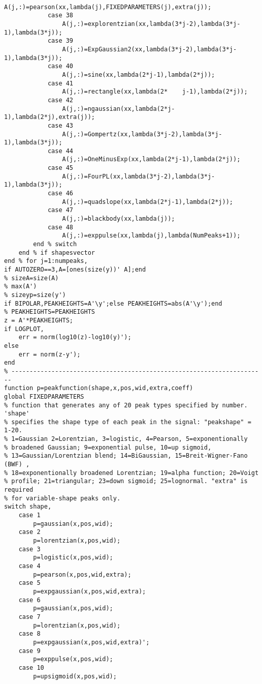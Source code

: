 \begin{lstlisting}
                A(j,:)=pearson(xx,lambda(j),FIXEDPARAMETERS(j),extra(j));
            case 38
                A(j,:)=explorentzian(xx,lambda(3*j-2),lambda(3*j-1),lambda(3*j));                    
            case 39
                A(j,:)=ExpGaussian2(xx,lambda(3*j-2),lambda(3*j-1),lambda(3*j));                               
            case 40
                A(j,:)=sine(xx,lambda(2*j-1),lambda(2*j));
            case 41
                A(j,:)=rectangle(xx,lambda(2*    j-1),lambda(2*j));
            case 42
                A(j,:)=ngaussian(xx,lambda(2*j-1),lambda(2*j),extra(j));
            case 43
                A(j,:)=Gompertz(xx,lambda(3*j-2),lambda(3*j-1),lambda(3*j));
            case 44
                A(j,:)=OneMinusExp(xx,lambda(2*j-1),lambda(2*j));
            case 45
                A(j,:)=FourPL(xx,lambda(3*j-2),lambda(3*j-1),lambda(3*j));        
            case 46
                A(j,:)=quadslope(xx,lambda(2*j-1),lambda(2*j));
            case 47
                A(j,:)=blackbody(xx,lambda(j));
            case 48
                A(j,:)=exppulse(xx,lambda(j),lambda(NumPeaks+1));
        end % switch
    end % if shapesvector
end % for j=1:numpeaks,
if AUTOZERO==3,A=[ones(size(y))' A];end
% sizeA=size(A)
% max(A')
% sizeyp=size(y')
if BIPOLAR,PEAKHEIGHTS=A'\y';else PEAKHEIGHTS=abs(A'\y');end
% PEAKHEIGHTS=PEAKHEIGHTS
z = A'*PEAKHEIGHTS;
if LOGPLOT,
    err = norm(log10(z)-log10(y)');
else
    err = norm(z-y');
end
% ----------------------------------------------------------------------
function p=peakfunction(shape,x,pos,wid,extra,coeff)
global FIXEDPARAMETERS
% function that generates any of 20 peak types specified by number. 'shape'
% specifies the shape type of each peak in the signal: "peakshape" = 1-20.
% 1=Gaussian 2=Lorentzian, 3=logistic, 4=Pearson, 5=exponentionally
% broadened Gaussian; 9=exponential pulse, 10=up sigmoid,
% 13=Gaussian/Lorentzian blend; 14=BiGaussian, 15=Breit-Wigner-Fano (BWF) ,
% 18=exponentionally broadened Lorentzian; 19=alpha function; 20=Voigt
% profile; 21=triangular; 23=down sigmoid; 25=lognormal. "extra" is required
% for variable-shape peaks only.
switch shape,
    case 1
        p=gaussian(x,pos,wid);
    case 2
        p=lorentzian(x,pos,wid);
    case 3
        p=logistic(x,pos,wid);
    case 4
        p=pearson(x,pos,wid,extra);
    case 5
        p=expgaussian(x,pos,wid,extra);
    case 6
        p=gaussian(x,pos,wid);
    case 7
        p=lorentzian(x,pos,wid);
    case 8
        p=expgaussian(x,pos,wid,extra)';
    case 9
        p=exppulse(x,pos,wid);
    case 10
        p=upsigmoid(x,pos,wid);

\end{lstlisting}
